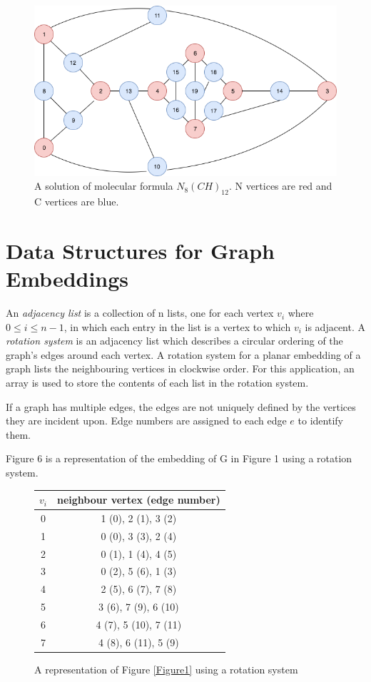 \documentclass[12pt]{article}
\begin{document}
\begin{figure}[H]
    \includegraphics[scale=.4,center]{Figure5}
    \caption{A solution of molecular formula $N_{8}(CH)_{12}$. N vertices are red and C vertices are blue.}
    \label{Figure5}
\end{figure}


\section{Data Structures for Graph Embeddings}

An \textit{adjacency list} is a collection of n lists, one for each vertex $v_i$ where $0 \leq i \leq n-1$, in which each entry in the list is a vertex to which $v_i$ is adjacent. A \textit{rotation system} is an adjacency list which describes a circular ordering of the graph's edges around each vertex. A rotation system for a planar embedding of a graph lists the neighbouring vertices in clockwise order. For this application, an array is used to store the contents of each list in the rotation system. 

If a graph has multiple edges, the edges are not uniquely defined by the vertices they are incident upon. Edge numbers are assigned to each edge $e$ to identify them.

Figure 6 is a representation of the embedding of G in Figure 1 using a rotation system.
\begin{figure}[H]
{\footnotesize
\begin{center}
\begin{tabular}{|c|c|} 
\hline
$v_i$ & neighbour vertex (edge number) \\
\hline

0 & 1 (0), 2 (1), 3 (2) \\
1 & 0 (0), 3 (3), 2 (4) \\
2 & 0 (1), 1 (4), 4 (5) \\
3 & 0 (2), 5 (6), 1 (3) \\
4 & 2 (5), 6 (7), 7 (8) \\
5 & 3 (6), 7 (9), 6 (10) \\
6 & 4 (7), 5 (10), 7 (11) \\
7 & 4 (8), 6 (11), 5 (9) \\

\hline
\end{tabular}
\end{center}
}
\caption{A representation of Figure \ref{Figure1} using a rotation system}
\label{Figure6}
\end{figure}
\end{document}
